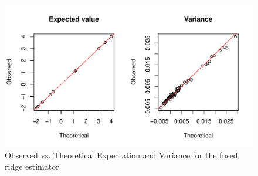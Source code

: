 \documentclass{article}\usepackage[]{graphicx}\usepackage[]{color}
\makeatletter
\def\maxwidth{ %
  \ifdim\Gin@nat@width>\linewidth
    \linewidth
  \else
    \Gin@nat@width
  \fi
}
\newenvironment{knitrout}{}{} %
\makeatother
\begin{document}
\begin{knitrout}
\color{fgcolor}\begin{figure}
\includegraphics[width=\maxwidth]{figure/q6_graphs-1} \caption[Observed vs]{Observed vs. Theoretical Expectation and Variance for the fused ridge estimator}\label{fig:q6_graphs}
\end{figure}


\end{knitrout}
\end{document}
